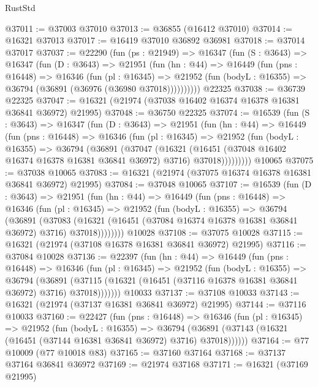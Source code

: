 \begin{lexlean}{RustStd}
\begin{coremodule}
@37011 := @37003 @37010
@37013 := @36855 (@16412 @37010)
@37014 := @16321 @37013
@37017 := @16419 @37010 @36892 @36981
@37018 := @37014 @37017
@37037 := @22290
    (fun (ps : @21949) =>
    @16347
      (fun (S : @3643) =>
      @16347
        (fun (D : @3643) =>
        @21951
          (fun (hn : @44) =>
          @16449
            (fun (pns : @16448) =>
            @16346
              (fun (pl : @16345) =>
              @21952 (fun (bodyL : @16355) => @36794 (@36891 (@36976 (@36980 @37018))))))))))
    @22325
@37038 := @36739 @22325
@37047 := @16321 (@21974 (@37038 @16402 @16374 @16378 @16381 @36841 @36972) @21995)
@37048 := @36750 @22325
@37074 := @16539
    (fun (S : @3643) =>
    @16347
      (fun (D : @3643) =>
      @21951
        (fun (hn : @44) =>
        @16449
          (fun (pns : @16448) =>
          @16346
            (fun (pl : @16345) =>
            @21952
              (fun (bodyL : @16355) =>
              @36794
                (@36891
                  (@37047
                    (@16321
                      (@16451 (@37048 @16402 @16374 @16378 @16381 @36841 @36972) @3716)
                      @37018)))))))))
    @10065
@37075 := @37038 @10065
@37083 := @16321 (@21974 (@37075 @16374 @16378 @16381 @36841 @36972) @21995)
@37084 := @37048 @10065
@37107 := @16539
    (fun (D : @3643) =>
    @21951
      (fun (hn : @44) =>
      @16449
        (fun (pns : @16448) =>
        @16346
          (fun (pl : @16345) =>
          @21952
            (fun (bodyL : @16355) =>
            @36794
              (@36891
                (@37083
                  (@16321 (@16451 (@37084 @16374 @16378 @16381 @36841 @36972) @3716) @37018))))))))
    @10028
@37108 := @37075 @10028
@37115 := @16321 (@21974 (@37108 @16378 @16381 @36841 @36972) @21995)
@37116 := @37084 @10028
@37136 := @22397
    (fun (hn : @44) =>
    @16449
      (fun (pns : @16448) =>
      @16346
        (fun (pl : @16345) =>
        @21952
          (fun (bodyL : @16355) =>
          @36794
            (@36891
              (@37115 (@16321 (@16451 (@37116 @16378 @16381 @36841 @36972) @3716) @37018)))))))
    @10033
@37137 := @37108 @10033
@37143 := @16321 (@21974 (@37137 @16381 @36841 @36972) @21995)
@37144 := @37116 @10033
@37160 := @22427
    (fun (pns : @16448) =>
    @16346
      (fun (pl : @16345) =>
      @21952
        (fun (bodyL : @16355) =>
        @36794 (@36891 (@37143 (@16321 (@16451 (@37144 @16381 @36841 @36972) @3716) @37018))))))
@37164 := @77 @10009 (@77 @10018 @83)
@37165 := @37160 @37164
@37168 := @37137 @37164 @36841 @36972
@37169 := @21974 @37168
@37171 := @16321 (@37169 @21995)

\end{coremodule}
\end{lexlean}
